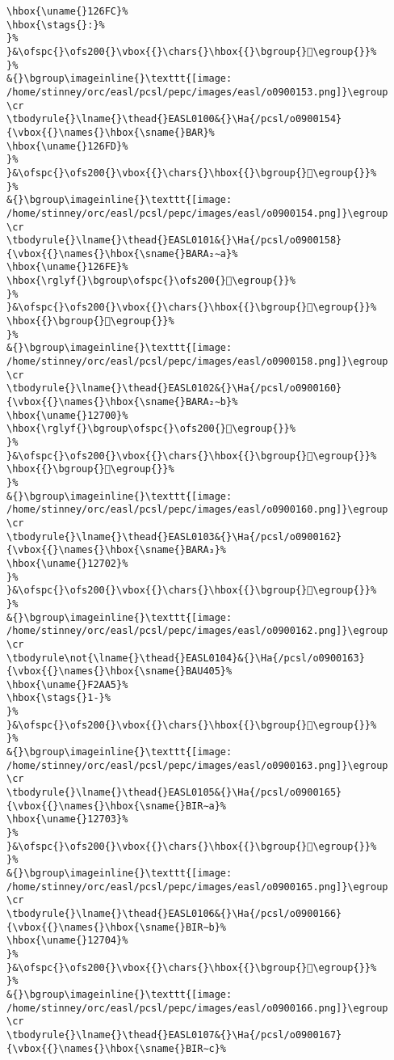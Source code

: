 \begin{verbatim}
\hbox{\uname{}126FC}%
\hbox{\stags{}:}%
}%
}&\ofspc{}\ofs200{}\vbox{{}\chars{}\hbox{{}\bgroup{}𒛼\egroup{}}%
}%
&{}\bgroup\imageinline{}\texttt{[image: /home/stinney/orc/easl/pcsl/pepc/images/easl/o0900153.png]}\egroup
\cr
\tbodyrule{}\lname{}\thead{}EASL0100&{}\Ha{/pcsl/o0900154}{\vbox{{}\names{}\hbox{\sname{}BAR}%
\hbox{\uname{}126FD}%
}%
}&\ofspc{}\ofs200{}\vbox{{}\chars{}\hbox{{}\bgroup{}𒛽\egroup{}}%
}%
&{}\bgroup\imageinline{}\texttt{[image: /home/stinney/orc/easl/pcsl/pepc/images/easl/o0900154.png]}\egroup
\cr
\tbodyrule{}\lname{}\thead{}EASL0101&{}\Ha{/pcsl/o0900158}{\vbox{{}\names{}\hbox{\sname{}BARA₂∼a}%
\hbox{\uname{}126FE}%
\hbox{\rglyf{}\bgroup\ofspc{}\ofs200{}𒛾\egroup{}}%
}%
}&\ofspc{}\ofs200{}\vbox{{}\chars{}\hbox{{}\bgroup{}𒛾\egroup{}}%
\hbox{{}\bgroup{}𒛿\egroup{}}%
}%
&{}\bgroup\imageinline{}\texttt{[image: /home/stinney/orc/easl/pcsl/pepc/images/easl/o0900158.png]}\egroup
\cr
\tbodyrule{}\lname{}\thead{}EASL0102&{}\Ha{/pcsl/o0900160}{\vbox{{}\names{}\hbox{\sname{}BARA₂∼b}%
\hbox{\uname{}12700}%
\hbox{\rglyf{}\bgroup\ofspc{}\ofs200{}𒜀\egroup{}}%
}%
}&\ofspc{}\ofs200{}\vbox{{}\chars{}\hbox{{}\bgroup{}𒜀\egroup{}}%
\hbox{{}\bgroup{}𒜁\egroup{}}%
}%
&{}\bgroup\imageinline{}\texttt{[image: /home/stinney/orc/easl/pcsl/pepc/images/easl/o0900160.png]}\egroup
\cr
\tbodyrule{}\lname{}\thead{}EASL0103&{}\Ha{/pcsl/o0900162}{\vbox{{}\names{}\hbox{\sname{}BARA₃}%
\hbox{\uname{}12702}%
}%
}&\ofspc{}\ofs200{}\vbox{{}\chars{}\hbox{{}\bgroup{}𒜂\egroup{}}%
}%
&{}\bgroup\imageinline{}\texttt{[image: /home/stinney/orc/easl/pcsl/pepc/images/easl/o0900162.png]}\egroup
\cr
\tbodyrule\not{\lname{}\thead{}EASL0104}&{}\Ha{/pcsl/o0900163}{\vbox{{}\names{}\hbox{\sname{}BAU405}%
\hbox{\uname{}F2AA5}%
\hbox{\stags{}1-}%
}%
}&\ofspc{}\ofs200{}\vbox{{}\chars{}\hbox{{}\bgroup{}󲪥\egroup{}}%
}%
&{}\bgroup\imageinline{}\texttt{[image: /home/stinney/orc/easl/pcsl/pepc/images/easl/o0900163.png]}\egroup
\cr
\tbodyrule{}\lname{}\thead{}EASL0105&{}\Ha{/pcsl/o0900165}{\vbox{{}\names{}\hbox{\sname{}BIR∼a}%
\hbox{\uname{}12703}%
}%
}&\ofspc{}\ofs200{}\vbox{{}\chars{}\hbox{{}\bgroup{}𒜃\egroup{}}%
}%
&{}\bgroup\imageinline{}\texttt{[image: /home/stinney/orc/easl/pcsl/pepc/images/easl/o0900165.png]}\egroup
\cr
\tbodyrule{}\lname{}\thead{}EASL0106&{}\Ha{/pcsl/o0900166}{\vbox{{}\names{}\hbox{\sname{}BIR∼b}%
\hbox{\uname{}12704}%
}%
}&\ofspc{}\ofs200{}\vbox{{}\chars{}\hbox{{}\bgroup{}𒜄\egroup{}}%
}%
&{}\bgroup\imageinline{}\texttt{[image: /home/stinney/orc/easl/pcsl/pepc/images/easl/o0900166.png]}\egroup
\cr
\tbodyrule{}\lname{}\thead{}EASL0107&{}\Ha{/pcsl/o0900167}{\vbox{{}\names{}\hbox{\sname{}BIR∼c}%

\end{verbatim}
